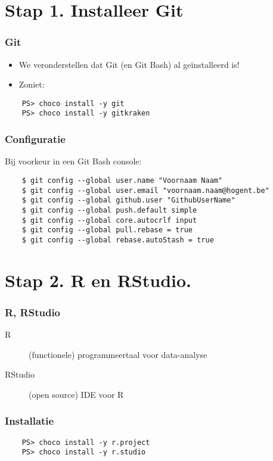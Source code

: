 \documentclass[aspectratio=169]{beamer}
\begin{document}
\section{Stap 1. Installeer Git}

\begin{frame}[fragile]
  \frametitle{Git}

  \begin{itemize}
    \item We veronderstellen dat Git (en Git Bash) al geïnstalleerd is!
    \item Zoniet:
  \end{itemize}

  \begin{verbatim}
    PS> choco install -y git
    PS> choco install -y gitkraken
  \end{verbatim}
\end{frame}

\begin{frame}[fragile]
  \frametitle{Configuratie}

  Bij voorkeur in een Git Bash console:

  \begin{verbatim}
    $ git config --global user.name "Voornaam Naam"
    $ git config --global user.email "voornaam.naam@hogent.be"
    $ git config --global github.user "GithubUserName"
    $ git config --global push.default simple
    $ git config --global core.autocrlf input
    $ git config --global pull.rebase = true
    $ git config --global rebase.autoStash = true
  \end{verbatim}

\end{frame}

\section{Stap 2. R en RStudio.}

\begin{frame}
  \frametitle{R, RStudio}

  \begin{description}
    \item[R] (functionele) programmeertaal voor data-analyse
    \item[RStudio] (open source) IDE voor R
  \end{description}

\end{frame}

\begin{frame}[fragile]
  \frametitle{Installatie}

  \begin{verbatim}
    PS> choco install -y r.project
    PS> choco install -y r.studio
  \end{verbatim}

\end{frame}
\end{document}
